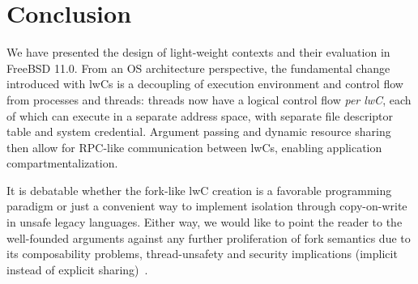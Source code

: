 \documentclass[10pt,twocolumn,a4paper]{article}
\begin{document}

\section{Conclusion}\label{conclusion}
We have presented the design of light-weight contexts and their evaluation in FreeBSD 11.0.
From an OS architecture perspective, the fundamental change introduced with lwCs is a decoupling of execution environment and control flow from processes and threads:
threads now have a logical control flow \textit{per lwC}, each of which can execute in a separate address space, with separate file descriptor table and system credential.
Argument passing and dynamic resource sharing then allow for RPC-like communication between lwCs, enabling application compartmentalization.

It is debatable whether the fork-like lwC creation is a favorable programming paradigm or just a convenient way to implement isolation through copy-on-write in unsafe legacy languages.
Either way, we would like to point the reader to the well-founded arguments against any further proliferation of fork semantics due to its composability problems, thread-unsafety and security implications (implicit instead of explicit sharing)~\cite{baumann2019a}.
\end{document}
